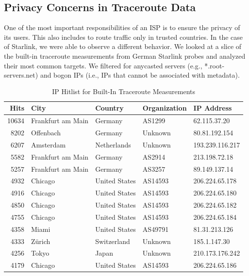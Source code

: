 \subsection{Privacy Concerns in Traceroute Data}

One of the most important responsibilities of an \ac{ISP} is to ensure the
privacy of its users. This also includes to route traffic only in trusted
countries. In the case of Starlink, we were able to observe a different
behavior. We looked at a slice of the built-in traceroute measurements from
German Starlink probes and analyzed their most common targets. We filtered for
anycasted servers (e.g., *.root-servers.net) and bogon IPs (i.e., IPs that
cannot be associated with metadata).

\begin{table}
	\caption{IP Hitlist for Built-In Traceroute Measurements}
	\label{fig:ip-hitlist-traceroute}
	\begin{tabular}{rllll}
		\toprule
		Hits  & City              & Country       & Organization & IP Address      \\
		\midrule
		10634 & Frankfurt am Main & Germany       & AS1299       & 62.115.37.20    \\
		8202  & Offenbach         & Germany       & Unknown      & 80.81.192.154   \\
		6207  & Amsterdam         & Netherlands   & Unknown      & 193.239.116.217 \\
		5582  & Frankfurt am Main & Germany       & AS2914       & 213.198.72.18   \\
		5257  & Frankfurt am Main & Germany       & AS3257       & 89.149.137.14   \\
		4932  & Chicago           & United States & AS14593      & 206.224.65.178  \\
		4916  & Chicago           & United States & AS14593      & 206.224.65.180  \\
		4850  & Chicago           & United States & AS14593      & 206.224.65.182  \\
		4755  & Chicago           & United States & AS14593      & 206.224.65.184  \\
		4358  & Miami             & United States & AS49791      & 81.31.213.126   \\
		4333  & Zürich            & Switzerland   & Unknown      & 185.1.147.30    \\
		4256  & Tokyo             & Japan         & Unknown      & 210.173.176.242 \\
		4179  & Chicago           & United States & AS14593      & 206.224.65.186  \\

\end{tabular}
\end{table}
